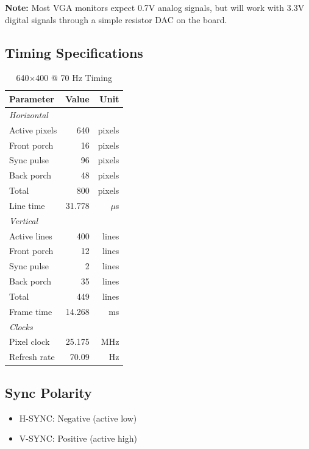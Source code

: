 \documentclass[11pt,letterpaper]{report}
\begin{document}
\textbf{Note:} Most VGA monitors expect 0.7V analog signals, but will work with 3.3V digital signals through a simple resistor DAC on the board.

\subsection{Timing Specifications}

\begin{table}[tbp]
\centering
\caption{640$\times$400 @ 70 Hz Timing}
\label{tab:timing_640}
\begin{tabular}{lrr}
\toprule
\textbf{Parameter} & \textbf{Value} & \textbf{Unit} \\
\midrule
\multicolumn{3}{l}{\textit{Horizontal}} \\
Active pixels & 640 & pixels \\
Front porch & 16 & pixels \\
Sync pulse & 96 & pixels \\
Back porch & 48 & pixels \\
Total & 800 & pixels \\
Line time & 31.778 & $\mu$s \\
\midrule
\multicolumn{3}{l}{\textit{Vertical}} \\
Active lines & 400 & lines \\
Front porch & 12 & lines \\
Sync pulse & 2 & lines \\
Back porch & 35 & lines \\
Total & 449 & lines \\
Frame time & 14.268 & ms \\
\midrule
\multicolumn{3}{l}{\textit{Clocks}} \\
Pixel clock & 25.175 & MHz \\
Refresh rate & 70.09 & Hz \\
\bottomrule
\end{tabular}
\end{table}

\subsection{Sync Polarity}

\begin{itemize}
    \item H-SYNC: Negative (active low)
    \item V-SYNC: Positive (active high)
\end{itemize}
\end{document}
